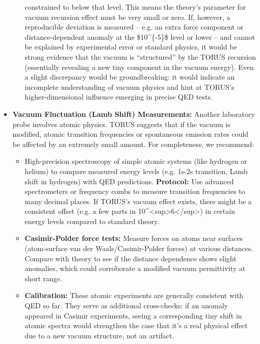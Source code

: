\documentclass[
]{article}
\begin{document}
\begin{itemize}
\begin{enumerate}
    constrained to below that level\hspace{0pt}. This means the theory's
    parameter for vacuum recursion effect must be very small or zero.
    If, however, a reproducible deviation is measured -- e.g. an extra
    force component or distance-dependent anomaly at the
    \$10\^{}\{-5\}\$ level or lower -- and cannot be explained by
    experimental error or standard physics, it would be strong evidence
    that the vacuum is ``structured'' by the TORUS recursion
    (essentially revealing a new tiny component in the vacuum
    energy)\hspace{0pt}. Even a slight discrepancy would be
    groundbreaking: it would indicate an incomplete understanding of
    vacuum physics and hint at TORUS's higher-dimensional influence
    emerging in precise QED tests.
  \end{enumerate}
\item
  \textbf{Vacuum Fluctuation (Lamb Shift) Measurements:} Another
  laboratory probe involves atomic physics. TORUS suggests that if the
  vacuum is modified, atomic transition frequencies or spontaneous
  emission rates could be affected by an extremely small
  amount\hspace{0pt}. For completeness, we recommend:

  \begin{itemize}
  \item
    High-precision spectroscopy of simple atomic systems (like hydrogen
    or helium) to compare measured energy levels (e.g. 1s-2s transition,
    Lamb shift in hydrogen) with QED predictions. \textbf{Protocol:} Use
    advanced spectrometers or frequency combs to measure transition
    frequencies to many decimal places. If TORUS's vacuum effect exists,
    there might be a consistent offset (e.g. a few parts in
    10\^{}\textless sup\textgreater6\textless/sup\textgreater) in
    certain energy levels compared to standard theory\hspace{0pt}.
  \item
    \textbf{Casimir-Polder force tests:} Measure forces on atoms near
    surfaces (atom-surface van der Waals/Casimir-Polder forces) at
    various distances. Compare with theory to see if the distance
    dependence shows slight anomalies, which could corroborate a
    modified vacuum permittivity at short range.
  \item
    \textbf{Calibration:} These atomic experiments are generally
    consistent with QED so far. They serve as additional cross-checks:
    if an anomaly appeared in Casimir experiments, seeing a
    corresponding tiny shift in atomic spectra would strengthen the case
    that it's a real physical effect due to a new vacuum structure, not
    an artifact.
  \end{itemize}
\end{itemize}
\end{document}
